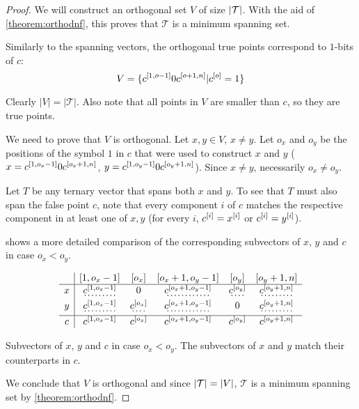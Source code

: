 \begin{proof}
We will construct an orthogonal set $V$
of size $\lvert\mathcal{T}\rvert$.
With the aid of \autoref{theorem:orthodnf},
this proves that $\mathcal{T}$ is a minimum spanning set.

Similarly to the spanning vectors,
the orthogonal true points correspond to $1$-bits of $c$:
$$
V =
\{c^{[1, o - 1]} 0 c^{[o + 1, n]}
| c^{[o]} = 1\}
$$

Clearly $|V| = |\mathcal{T}|$.
Also note that all points in $V$ are smaller than $c$,
so they are true points.

We need to prove that $V$ is orthogonal.
Let $x, y \in V$, $x \neq y$.
Let $o_x$ and $o_y$ be the positions of the symbol $1$
in $c$
that were used to construct $x$ and $y$
($x = c^{[1, o_x - 1]} 0 c^{[o_x + 1, n]}$,
$y = c^{[1, o_y - 1]} 0 c^{[o_y + 1, n]}$).
Since $x \neq y$, necessarily $o_x \neq o_y$.

Let $T$ be any ternary vector that spans both $x$ and $y$.
To see that $T$ must also span the false point $c$,
note that every component $i$ of $c$
matches the respective component in at least one of $x,y$
(for every $i$,
$c^{[i]} = x^{[i]}$ or $c^{[i]} = y^{[i]}$).

shows a more detailed comparison
of the corresponding subvectors of $x$, $y$ and $c$
in case $o_x < o_y$.

\newcommand{\emphvector}[1]{\dotuline{#1}}

\begin{table}[h]
\centering
$$\begin{array}{c|ccccc}
& \interval{1}{o_x - 1} & [o_x]
& \interval{o_x + 1}{o_y - 1} & [o_y]
& \interval{o_y + 1}{n} \\
\hline
x
& \emphvector{\bits{c}{1}{o_x - 1}}
& 0
& \emphvector{\bits{c}{o_x + 1}{o_y - 1}}
& \emphvector{\bit{c}{o_y}}
& \emphvector{\bits{c}{o_y + 1}{n}} \\
y
& \emphvector{\bits{c}{1}{o_x - 1}}
& \emphvector{\bit{c}{o_x}}
& \emphvector{\bits{c}{o_x + 1}{o_y - 1}}
& 0
& \emphvector{\bits{c}{o_y + 1}{n}} \\
\hline
c
& \bits{c}{1}{o_x - 1}
& \bit{c}{o_x}
& \bits{c}{o_x + 1}{o_y - 1}
& \bit{c}{o_y}
& \bits{c}{o_y + 1}{n}
\end{array}$$
\caption[Subvectors of $x$, $y$ and $c$
in case $o_x < o_y$]
{Subvectors of $x$, $y$ and $c$
in case $o_x < o_y$.
The \emphvector{emphasized} subvectors of $x$ and $y$
match their counterparts in $c$.}
\label{tab:xyc}
\end{table}


We conclude that $V$ is orthogonal
and since $\lvert\mathcal{T}\rvert = \lvert V\rvert$,
$\mathcal{T}$ is a minimum spanning set
by \autoref{theorem:orthodnf}.
\end{proof}


